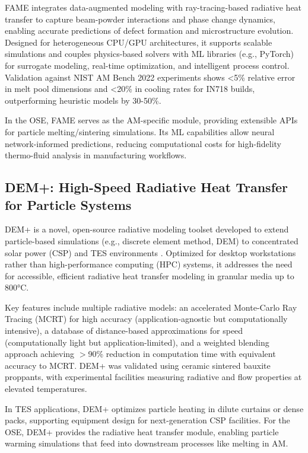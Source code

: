\documentclass[11pt]{article}
\begin{document}
FAME integrates data-augmented modeling with ray-tracing-based radiative heat transfer to capture beam-powder interactions and phase change dynamics, enabling accurate predictions of defect formation and microstructure evolution. Designed for heterogeneous CPU/GPU architectures, it supports scalable simulations and couples physics-based solvers with ML libraries (e.g., PyTorch) for surrogate modeling, real-time optimization, and intelligent process control. Validation against NIST AM Bench 2022 experiments shows <5\% relative error in melt pool dimensions and <20\% in cooling rates for IN718 builds, outperforming heuristic models by 30-50\%.

In the OSE, FAME serves as the AM-specific module, providing extensible APIs for particle melting/sintering simulations. Its ML capabilities allow neural network-informed predictions, reducing computational costs for high-fidelity thermo-fluid analysis in manufacturing workflows.

\subsection*{DEM+: High-Speed Radiative Heat Transfer for Particle Systems}
\noindent
DEM+ is a novel, open-source radiative modeling toolset developed to extend particle-based simulations (e.g., discrete element method, DEM) to concentrated solar power (CSP) and TES environments \cite{schraderDevelopmentExperimentalOptimization2024}. Optimized for desktop workstations rather than high-performance computing (HPC) systems, it addresses the need for accessible, efficient radiative heat transfer modeling in granular media up to 800°C.

Key features include multiple radiative models: an accelerated Monte-Carlo Ray Tracing (MCRT) for high accuracy (application-agnostic but computationally intensive), a database of distance-based approximations for speed (computationally light but application-limited), and a weighted blending approach achieving $>$90\% reduction in computation time with equivalent accuracy to MCRT. DEM+ was validated using ceramic sintered bauxite proppants, with experimental facilities measuring radiative and flow properties at elevated temperatures.

In TES applications, DEM+ optimizes particle heating in dilute curtains or dense packs, supporting equipment design for next-generation CSP facilities. For the OSE, DEM+ provides the radiative heat transfer module, enabling particle warming simulations that feed into downstream processes like melting in AM.
\end{document}
